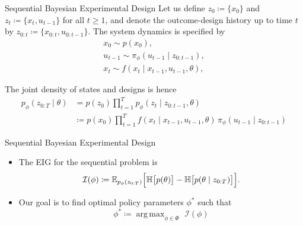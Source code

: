 \documentclass[10pt, aspectratio=1610]{beamer}
\DeclareMathOperator*{\argmax}{arg\,max}
\begin{document}
    \begin{frame}{Sequential Bayesian Experimental Design}
      Let us define $z_0 \coloneq \{x_0\}$ and $z_{t} \coloneq \{x_t, u_{t-1}\}$ for all $t \geq 1$, and denote the outcome-design history up to time $t$ by $z_{0:t} \coloneq \{x_{0:t}, u_{0:t-1}\}$. The system dynamics is specified by
      \begin{gather}
        x_0 \sim p(x_0), \\
        u_{t-1} \sim \pi_\phi(u_{t-1} \mid z_{0:t-1}), \\
        x_t \sim f(x_t \mid x_{t-1}, u_{t-1}, \theta),
      \end{gather}
      \pause

      \vspace{0.2cm}
      The joint density of states and designs is hence
      \begin{align}\label{eq:joint_density}
        p_{\phi}(z_{0:T} \mid \theta) &= p(z_{0}) \prod_{t=1}^T p_{\phi}(z_{t} \mid z_{0:t-1}, \theta) \\
        &\coloneq p(x_0) \prod_{t=1}^T f(x_t \mid x_{t-1}, u_{t-1}, \theta) \, \pi_\phi(u_{t-1} \mid z_{0:t-1})
      \end{align}
    \end{frame}

    \begin{frame}{Sequential Bayesian Experimental Design}
      \begin{itemize}
        \item The EIG for the sequential problem is
          \begin{equation}
            \mathcal{I}(\phi) \coloneq \mathbb{E}_{p_{\phi}(z_{0:T})} \Bigl[ \mathbb{H}\bigl[p(\theta)\bigr] - \mathbb{H}\bigl[p(\theta \mid z_{0:T})\bigr] \Bigr].
          \end{equation}
        \item Our goal is to find optimal policy parameters $\phi^*$ such that
          \begin{equation}
            \phi^* \coloneq \argmax_{\phi \in \Phi} \,\, \mathcal{I}(\phi)
          \end{equation}
      \end{itemize}
    \end{frame}
\end{document}
